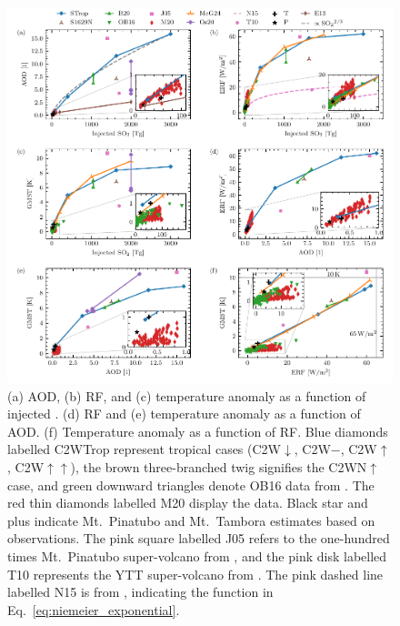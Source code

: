 \documentclass[draft]{agujournal2019}
\begin{document}
  \begin{figure}
    \centering \includegraphics[width=\textwidth]{figure4}

    \caption{(a) AOD, (b) RF, and (c) temperature
      anomaly as a function of injected \@. (d) RF and (e) temperature anomaly
      as a function of AOD. (f) Temperature anomaly as a function of RF. Blue diamonds
      labelled C2WTrop represent tropical cases (C2W\(\downarrow\), C2W\(-\),
      C2W\(\uparrow\), C2W\(\uparrow\uparrow\)), the brown three-branched twig signifies
      the C2WN\(\uparrow\) case, and green downward triangles denote OB16 data from
      . The red thin diamonds labelled M20 display the
       data. Black star and plus indicate Mt.\ Pinatubo and
      Mt.\ Tambora estimates based on observations. The pink square labelled J05 refers
      to the one-hundred times Mt.\ Pinatubo super-volcano from , and
      the pink disk labelled T10 represents the YTT super-volcano from
      . The pink dashed line labelled N15 is from
      , indicating the function in
      Eq.~\ref{eq:niemeier_exponential}.}\label{fig:4_parameter_scan}%
  \end{figure}
\end{document}

